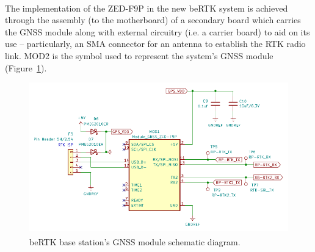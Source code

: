 The implementation of the ZED-F9P in the new beRTK\textsuperscript{\textregistered} system is achieved through the assembly (to the motherboard) of a secondary board which carries the GNSS module along with external circuitry (i.e. a carrier board) to aid on its use -- particularly, an SMA connector for an antenna to establish the RTK radio link. MOD2 is the symbol used to represent the system's GNSS module (Figure~\ref{fig:ZEDF9P_circuit}).

\begin{figure}[h]
	\centering
	\includegraphics[width=1.0\textwidth]{Chapters/Figures/chapter3/Modules_ZEDF9P.pdf}
	\caption{beRTK\textsuperscript{\textregistered} base station's GNSS module schematic diagram.}
	\label{fig:ZEDF9P_circuit}
\end{figure}

